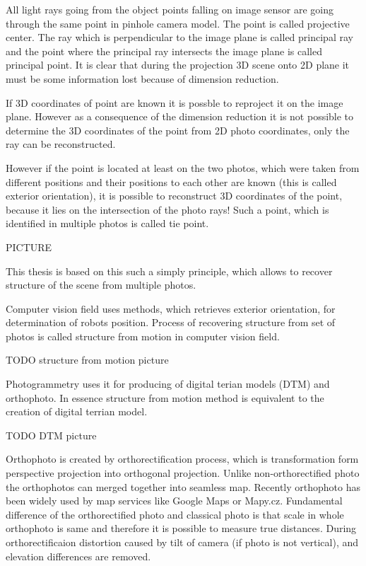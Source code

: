 \documentclass[a4paper,12pt]{report}
\begin{document}
All light rays going from the object points falling on image sensor are going through the same point in pinhole camera model.
The point is called projective center. The ray which is perpendicular to the image plane is called principal ray and the point 
where the principal ray intersects the image plane is called principal point. It is clear that during the projection 
3D scene onto 2D plane it must be some information lost because of dimension reduction.


If 3D coordinates of point are known it is possble to reproject it on the image plane. However as a consequence 
of the dimension reduction it is not possible to determine the 3D coordinates of the point from 2D photo coordinates, 
only the ray can be reconstructed.


However if the point is located at least on the two photos, which were taken from different positions and their positions 
to each other are known (this is called exterior orientation), it is possible 
to reconstruct 3D coordinates of the point, because it lies on the intersection of the photo rays!
Such a point, which is identified in multiple photos is called tie point.

PICTURE


This thesis is based on this such a simply principle, which allows to recover structure of the scene from multiple photos. 


Computer vision field uses methods, which retrieves exterior orientation, for determination of robots position. 
Process of recovering structure from set of photos is called structure from motion in computer vision field.

TODO structure from motion picture

Photogrammetry uses it for producing of digital terian models (DTM) and 
orthophoto. In essence structure from motion method is equivalent to the creation 
of digital terrian model.

TODO DTM picture

Orthophoto is created by 
orthorectification process, which is transformation form perspective projection into orthogonal projection.
Unlike non-orthorectified photo the orthophotos can merged together into seamless map. Recently 
orthophoto has been widely used by map services like Google Maps or Mapy.cz. Fundamental 
difference of the orthorectified photo and classical photo is that scale in whole orthophoto is same
and therefore it is possible to measure true distances. During orthorectificaion distortion 
caused by tilt of camera (if photo is not vertical), and elevation differences are removed.
\end{document}
